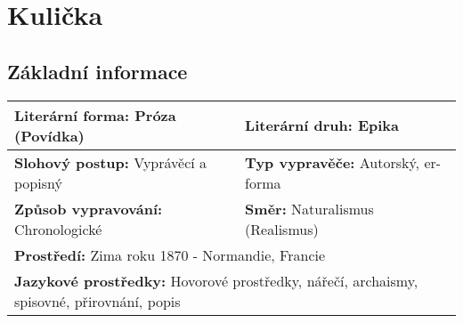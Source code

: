 \section{Kulička}
\label{sec:kulicka}
\subsection*{Základní informace}
\begin{tabularx}{\linewidth}{l|l}
  \textbf{Literární forma:} Próza (Povídka)    & \textbf{Literární druh:} Epika                                         \\
  \hline
  \textbf{Slohový postup:} Vyprávěcí a popisný & \textbf{Typ vypravěče:} Autorský, er-forma                             \\
  \hline
  \textbf{Způsob vypravování:} Chronologické   & \textbf{Směr:} Naturalismus (Realismus)                                \\
  \hline
  \multicolumn{2}{l}{\textbf{Prostředí:} Zima roku 1870 - Normandie, Francie}                                           \\
  \hline
  \multicolumn{2}{l}{\textbf{Jazykové prostředky:} Hovorové prostředky, nářečí, archaismy, spisovné, přirovnání, popis} \\
\end{tabularx}
